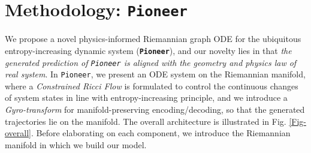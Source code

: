 \section{Methodology: \texttt{Pioneer}}

We propose a novel physics-informed Riemannian graph ODE for the ubiquitous entropy-increasing dynamic system (\textbf{\texttt{Pioneer}}), 
and our novelty lies in that \emph{the generated prediction of \texttt{Pioneer} is aligned with the  geometry and physics law of real system}.
In \texttt{Pioneer}, we present an ODE system on the Riemannian manifold,
where a \emph{Constrained Ricci Flow} is formulated to control the continuous changes of system states in line with entropy-increasing principle,
and we introduce a \emph{Gyro-transform} for manifold-preserving encoding/decoding, so that the generated trajectories lie on the manifold.
The overall architecture is illustrated in Fig. \ref{Fig-overall}. 
Before elaborating on each component, 
we introduce the Riemannian manifold in which we build our model.

